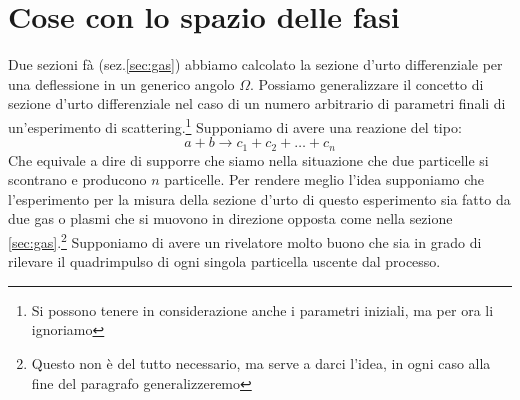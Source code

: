 \documentclass[11pt,a4paper]{article}
\begin{document}
	\section{Cose con lo spazio delle fasi}
		Due sezioni fà (sez.\ref{sec:gas}) abbiamo calcolato la sezione d'urto differenziale per una deflessione in un generico angolo $\Omega$.\newline
		Possiamo generalizzare il concetto di sezione d'urto differenziale nel caso di un numero arbitrario di parametri finali di un'esperimento di scattering.\footnote{Si possono tenere in considerazione anche i parametri iniziali, ma per ora li ignoriamo}\newline
		Supponiamo di avere una reazione del tipo:
		\begin{equation}
			a+b\rightarrow c_1+c_2+\dots+c_n
		\end{equation}
		Che equivale a dire di supporre che siamo nella situazione che due particelle si scontrano e producono $n$ particelle.\newline
		Per rendere meglio l'idea supponiamo che l'esperimento per la misura della sezione d'urto di questo esperimento sia fatto da due gas o plasmi che si muovono in direzione opposta come nella sezione \ref{sec:gas}.\footnote{Questo non è del tutto necessario, ma serve a darci l'idea, in ogni caso alla fine del paragrafo generalizzeremo}\newline
		Supponiamo di avere un rivelatore molto buono che sia in grado di rilevare il quadrimpulso di ogni singola particella uscente dal processo.\newline
\end{document}
